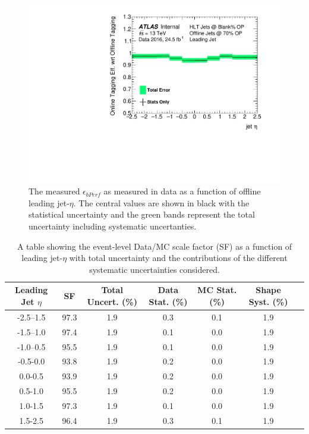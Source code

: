 \begin{figure}[!ht]
  \begin{center}
    \includegraphics[width=0.8\linewidth, angle=0]{figs/Trigger/btrigger_old/fullSyst_EventEfficiency_leadingJetEta.pdf}
  \end{center}
  \caption{
    The measured $\epsilon_{bPerf}$ as measured in data as a function of offline leading jet-$\eta$.
    The central values are shown in black with the statistical uncertainty and the green bands represent the total uncertainty including systematic uncertanties.
  }
  \label{fig:bTrig_eventSys}
\end{figure}

\begin{table}[!ht]
\begin{tabular}{|c||c|c||c|c|c||c|}
Leading Jet $\eta$ & SF & Total Uncert. (\%) & Data Stat. (\%) & MC Stat. (\%) & Shape Syst. (\%)\\
\hline
-2.5--1.5 & 97.3 & 1.9 & 0.3 & 0.1 & 1.9 \\
-1.5--1.0 & 97.4 & 1.9 & 0.1 & 0.0 & 1.9 \\
-1.0--0.5 & 95.5 & 1.9 & 0.1 & 0.0 & 1.9 \\
-0.5-0.0 & 93.8 & 1.9 & 0.2  & 0.0 & 1.9 \\
0.0-0.5 & 93.9 & 1.9 & 0.2   & 0.0 & 1.9 \\
0.5-1.0 & 95.5 & 1.9 & 0.2   & 0.0 & 1.9 \\
1.0-1.5 & 97.3 & 1.9 & 0.1   & 0.0 & 1.9 \\
1.5-2.5 & 96.4 & 1.9 & 0.3   & 0.1 & 1.9 \\
\end{tabular}
\caption{A table showing the event-level Data/MC scale factor (SF) as a function of leading jet-$\eta$ with total uncertainty and the contributions of the different systematic uncertainties considered.}
\label{tab:bTrig_eventEff}
\end{table}

